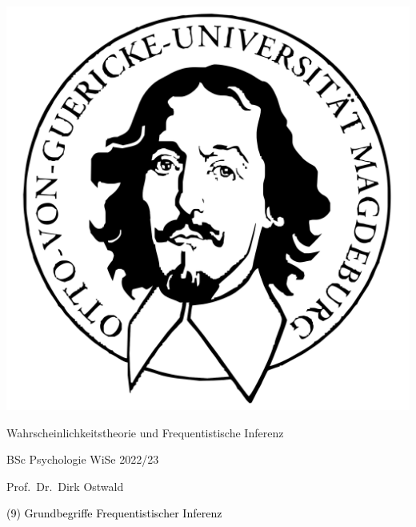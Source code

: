 \documentclass[
  8pt,
  ignorenonframetext,
]{beamer}
\author{}
\date{\vspace{-2.5em}}
\begin{document}
\begin{frame}[plain]{}
\protect\hypertarget{section}{}
\center

\begin{center}\includegraphics[width=0.2\linewidth]{9_Abbildungen/wtfi_9_otto} \end{center}

\vspace{2mm}

\Large

Wahrscheinlichkeitstheorie und Frequentistische Inferenz \vspace{6mm}

\large

BSc Psychologie WiSe 2022/23

\vspace{6mm}
\normalsize

Prof.~Dr.~Dirk Ostwald
\end{frame}

\begin{frame}[plain]{}
\protect\hypertarget{section-1}{}
\vfill
\center
\huge

\textcolor{black}{(9) Grundbegriffe Frequentistischer Inferenz} \vfill
\end{frame}
\end{document}
